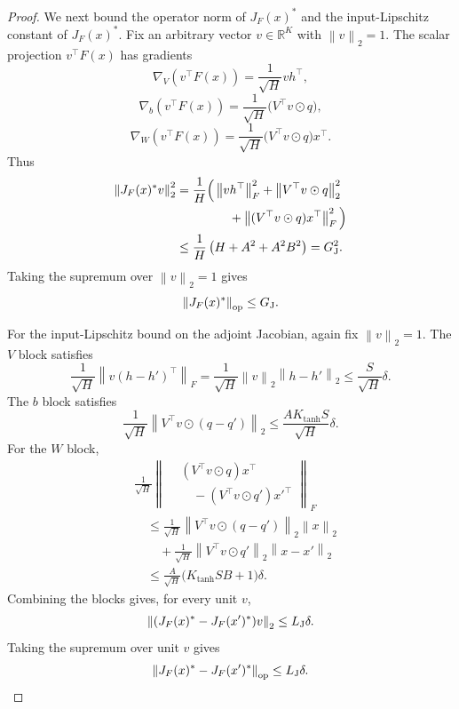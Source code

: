 \documentclass[conference,compsoc]{IEEEtran}
\newcommand{\R}{\mathbb{R}}
\newcommand{\op}{\mathrm{op}}
\newcommand{\norm}[1]{\left\lVert #1\right\rVert}
\begin{document}
\begin{proof}
We next bound the operator norm of $J_F(x)^\ast$ and the input-Lipschitz
constant of $J_F(x)^\ast$.  Fix an arbitrary vector $v\in\R^K$ with
$\norm{v}_2=1$.  The scalar projection $v^\top F(x)$ has gradients
\[
\nabla_V(v^\top F(x))=\frac1{\sqrt H}vh^\top,
\]
\[
\nabla_b(v^\top F(x))=\frac1{\sqrt H}\bigl(V^\top v\odot q\bigr),
\]
\[
\nabla_W(v^\top F(x))=
\frac1{\sqrt H}\bigl(V^\top v\odot q\bigr)x^\top.
\]
Thus
\begin{align*}
\norm{J_F(x)^\ast v}_2^2
&=
\frac1H\Big(
\norm{vh^\top}_F^2
+
\norm{V^\top v\odot q}_2^2\\
&\hspace{15mm}+
\norm{(V^\top v\odot q)x^\top}_F^2
\Big)\\
&\le
\frac1H\left(H+A^2+A^2B^2\right)
=
G_{\rm J}^2.
\end{align*}
Taking the supremum over $\norm{v}_2=1$ gives
\begin{equation}
\label{eq:mc-J-operator-bound}
\norm{J_F(x)^\ast}_{\op}\le G_{\rm J}.
\end{equation}

For the input-Lipschitz bound on the adjoint Jacobian, again fix
$\norm{v}_2=1$.  The $V$ block satisfies
\[
\frac1{\sqrt H}\norm{v(h-h')^\top}_F
=
\frac1{\sqrt H}\norm{v}_2\norm{h-h'}_2
\le
\frac S{\sqrt H}\delta.
\]
The $b$ block satisfies
\[
\frac1{\sqrt H}\norm{V^\top v\odot(q-q')}_2
\le
\frac{AK_{\tanh}S}{\sqrt H}\delta.
\]
For the $W$ block,
\begin{align*}
&\frac1{\sqrt H}
\left\|
\begin{aligned}
&(V^\top v\odot q)x^\top\\
&\quad-(V^\top v\odot q')x'^\top
\end{aligned}
\right\|_F\\
&\quad\le
\frac1{\sqrt H}\norm{V^\top v\odot(q-q')}_2\norm{x}_2\\
&\qquad+
\frac1{\sqrt H}\norm{V^\top v\odot q'}_2\norm{x-x'}_2\\
&\quad\le
\frac{A}{\sqrt H}\bigl(K_{\tanh}SB+1\bigr)\delta.
\end{align*}
Combining the blocks gives, for every unit $v$,
\[
\norm{(J_F(x)^\ast-J_F(x')^\ast)v}_2
\le
L_{\rm J}\delta.
\]
Taking the supremum over unit $v$ gives
\begin{equation}
\label{eq:mc-J-lipschitz}
\norm{J_F(x)^\ast-J_F(x')^\ast}_{\op}
\le
L_{\rm J}\delta.
\end{equation}


\end{proof}
\end{document}

